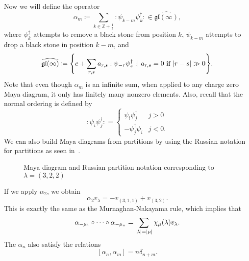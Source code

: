 \documentclass[leqno, openany]{memoir}
\theoremstyle{definition}
\theoremstyle{remark}
\theoremstyle{plain}
\theoremstyle{definition}
\theoremstyle{remark}
\newcommand{\Z}{\mathbb{Z}}
\newcommand{\mf}[1]{\mathfrak{#1}}
\newcommand{\wh}[1]{\widehat{#1}}
\begin{document}
Now we will define the operator
\[ \alpha_m \coloneqq \sum_{k \in \Z+\frac{1}{2}} :\psi_{k-m} \psi_k^{\dag}: \in \wh{\mf{gl}(\infty)}, \]
where $\psi_k^{\dag}$ attempts to remove a black stone from position $k$, $\psi_{k-m}$ attempts to drop a black stone in position $k-m$, and
\[ \wh{\mf{gl}(\infty)} \coloneqq \qty{c + \sum_{r,s} a_{r,s} :\psi_{-r} \psi_s^{\dag}: \mid a_{r,s} = 0 \text{ if } \abs{r-s} \gg 0}. \]
Note that even though $\alpha_m$ is an infinite sum, when applied to any charge zero Maya diagram, it only has finitely many nonzero elements. Also, recall that the normal ordering is defined by
\[ :\psi_i \psi_j^{\dag}: = \begin{cases}
                              \psi_i \psi_j^{\dag} & j > 0 \\
                              -\psi_j^{\dag} \psi_i & j < 0.
                            \end{cases} \]
We can also build Maya diagrams from partitions by using the Russian notation for partitions as seen in~.
\begin{figure}[htpb]
  \centering
  \caption{Maya diagram and Russian partition notation corresponding to $\lambda = (3,2,2)$}
  \label{fig:russianmaya}
\end{figure}
If we apply $\alpha_2$, we obtain
\[ \alpha_2 v_{\lambda} = - v_{(3,1,1)} + v_{(3,2)}. \]
This is exactly the same as the Murnaghan-Nakayama rule, which implies that
\[ \alpha_{-\mu_1} \circ \cdots \circ \alpha_{-\mu_n} = \sum_{\abs{\lambda} = \abs{\mu}} \chi_{\mu}(\lambda) v_{\lambda}. \]
The $\alpha_n$ also satisfy the relations
\[ [\alpha_n, \alpha_m] = n \delta_{n+m}. \]
\end{document}
